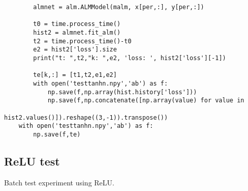 \begin{verbatim}
        almnet = alm.ALMModel(malm, x[per,:], y[per,:])

        t0 = time.process_time()
        hist2 = almnet.fit_alm()
        t2 = time.process_time()-t0
        e2 = hist2['loss'].size
        print("t: ",t2,"k: ",e2, 'loss: ', hist2['loss'][-1])
    
        te[k,:] = [t1,t2,e1,e2]
        with open('testtanhn.npy','ab') as f:
            np.save(f,np.array(hist.history['loss']))
            np.save(f,np.concatenate([np.array(value) for value in 
                                      hist2.values()]).reshape((3,-1)).transpose())
    with open('testtanhn.npy','ab') as f:
        np.save(f,te)

\end{verbatim}
\subsection{ReLU test}
Batch test experiment using ReLU.
